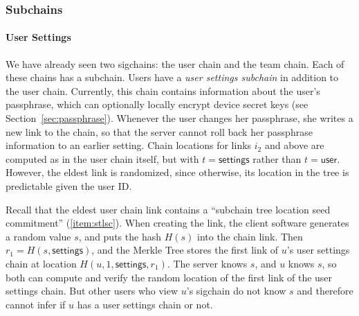 \subsubsection{Subchains}
\label{sec:subchains}

\newcommand{\user}{\textsf{user}}
\newcommand{\settings}{\textsf{settings}}
\newcommand{\teamMembership}{\textsf{teamMembership}}

\paragraph{User Settings}
We have already seen two sigchains: the user chain and the team chain. Each of
these chains has a subchain. Users have a \textit{user settings subchain} in
addition to the user chain. Currently, this chain contains information about
the user's passphrase, which can optionally locally encrypt device secret
keys (see Section~\ref{sec:passphrase}). Whenever the user changes her
passphrase, she writes a new link to the chain, so that the server cannot roll
back her passphrase information to an earlier setting.  Chain locations for
links $i_2$ and above are computed as in the user chain itself, but with $t =
\settings$ rather than $t = \user$.  However, the eldest link is randomized,
since otherwise, its location in the tree is predictable given the user ID.

Recall that the eldest user chain link contains a ``subchain tree location seed
commitment'' (\ref{item:stlsc}). When creating the link, the client software
generates a random value $s$, and puts the hash $H(s)$ into the chain link.
Then $r_1 = H(s, \settings)$, and the Merkle Tree stores the first link of 
$u$'s user settings chain at location $H(u, 1, \settings, r_1)$. The server knows 
$s$, and $u$ knows $s$, so both can compute and verify the random location of 
the first link of the user settings chain. But other users who view $u$'s
sigchain do not know $s$ and therefore cannot infer if $u$ has a user
settings chain or not.

